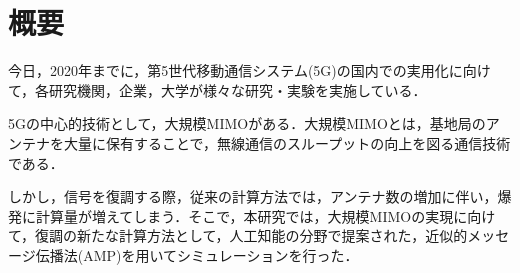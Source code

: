 \chapter{概要}
今日，2020年までに，第5世代移動通信システム(5G)の国内での実用化に向けて，各研究機関，企業，大学が様々な研究・実験を実施している．

5Gの中心的技術として，大規模MIMOがある．大規模MIMOとは，基地局のアンテナを大量に保有することで，無線通信のスループットの向上を図る通信技術である．

しかし，信号を復調する際，従来の計算方法では，アンテナ数の増加に伴い，爆発に計算量が増えてしまう．そこで，本研究では，大規模MIMOの実現に向けて，復調の新たな計算方法として，人工知能の分野で提案された，近似的メッセージ伝播法(AMP)を用いてシミュレーションを行った．